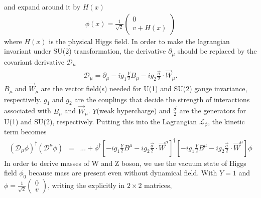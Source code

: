 and expand around it by $H(x)$
\begin{eqnarray} 
\phi(x) = \frac{1}{\sqrt{2}} \left(  \begin{array}{c} 0 \\ v + H(x) \end{array} \right)
\end{eqnarray} 
where $H(x)$ is the physical Higgs field.  
In order to make the lagrangian invariant under SU(2) transformation,
the derivative $\partial_\mu$ should be replaced by the covariant 
derivative $\mathcal{D}_\mu$
\begin{eqnarray} 
\mathcal{D}_\mu 
= 
\partial_\mu - ig_1 \frac{Y}{2} B_\mu - ig_2 \frac{\vec{\sigma}}{2} \cdot \vec{W}_\mu. 
\end{eqnarray} 
$B_\mu$ and $\vec{W}_\mu$ are the vector field(s) needed for U(1) and 
SU(2) gauge invariance, respectively. 
$g_1$ and $g_2$ are the couplings that decide the strength of 
interactions associated with $B_\mu$ and $\vec{W}_\mu$. 
$Y$(weak hypercharge) and $\frac{\vec{\sigma}}{2}$ are the generators for U(1) and SU(2), respectively. 
Putting this into the Lagrangian $\mathcal{L_\phi}$, the kinetic term becomes 
\begin{eqnarray} 
\left( \mathcal{D}_\mu \phi \right)^\dagger \left( \mathcal{D}^\mu \phi \right) 
&=& ... +  
\phi^\dagger 
\left[ - ig_1 \frac{Y}{2} B^\mu
       - ig_2 \frac{\vec{\sigma}}{2} \cdot \vec{W}^\mu \right]^\dagger 
\left[ - ig_1 \frac{Y}{2} B^\mu
       - ig_2 \frac{\vec{\sigma}}{2} \cdot \vec{W}^\mu \right] 
\phi  
\end{eqnarray}
In order to derive masses of W and Z boson, we use the vacuum state of Higgs field $\phi_0$
because mass are present even without dynamical field.  
With $Y=1$ and $\displaystyle \phi = \frac{1}{\sqrt{2}} \left(  \begin{array}{c} 0 \\ v \end{array} \right)$, 
writing the explicitly in $2\times2$ matrices, 
